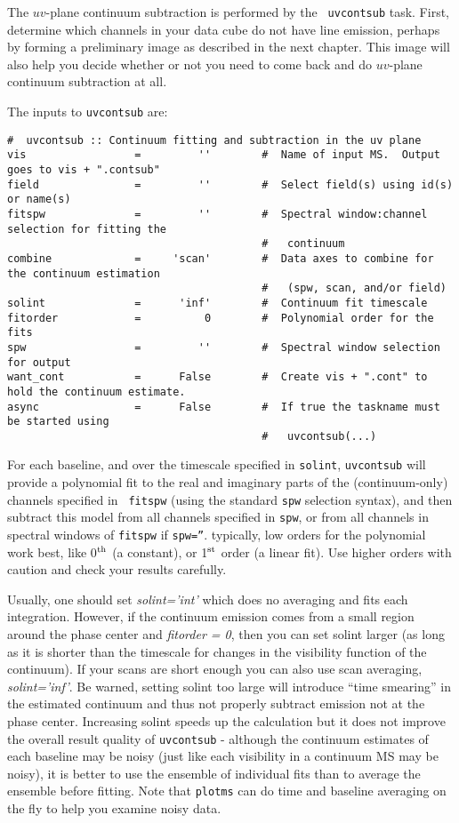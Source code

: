 {The $uv$-plane continuum subtraction is performed by the {\tt
  uvcontsub} task.  First, determine which channels in your data cube
do not have line emission, perhaps by forming a preliminary image as
described in the next chapter.  This image will also help you decide
whether or not you need to come back and do $uv$-plane continuum
subtraction at all. 


The inputs to {\tt uvcontsub} are:
\small
\begin{verbatim}
#  uvcontsub :: Continuum fitting and subtraction in the uv plane
vis                 =         ''        #  Name of input MS.  Output goes to vis + ".contsub"
field               =         ''        #  Select field(s) using id(s) or name(s)
fitspw              =         ''        #  Spectral window:channel selection for fitting the
                                        #   continuum
combine             =     'scan'        #  Data axes to combine for the continuum estimation
                                        #   (spw, scan, and/or field)
solint              =      'inf'        #  Continuum fit timescale
fitorder            =          0        #  Polynomial order for the fits
spw                 =         ''        #  Spectral window selection for output
want_cont           =      False        #  Create vis + ".cont" to hold the continuum estimate.
async               =      False        #  If true the taskname must be started using
                                        #   uvcontsub(...)
\end{verbatim}

For each baseline, and over the timescale specified in {\tt solint},
{\tt uvcontsub} will provide a polynomial fit to the real and
imaginary parts of the (continuum-only) channels specified in {\tt
fitspw} (using the standard {\tt spw} selection syntax), 
and then subtract this model from all channels specified in {\tt spw}, or
from all channels in spectral windows of {\tt fitspw} if {\tt spw=''}.
typically, low orders for the polynomial work best, like 0$^{\rm th}$ (a
constant), or 1$^{\rm st}$ order (a linear fit). Use higher orders with caution
and check your results carefully.

Usually, one should set {\it solint='int'} which does no averaging and fits
each integration. However, if the continuum emission comes from a small
region around the phase center and {\it fitorder = 0}, then you can set solint
larger (as long as it is shorter than the timescale for changes in the
visibility function of the continuum).  If your scans are short enough you
can also use scan averaging, {\it solint='inf'}. Be warned, setting solint too
large will introduce ``time smearing'' in the estimated continuum and thus
not properly subtract emission not at the phase center.  Increasing solint
speeds up the calculation but it does not improve the overall result
quality of {\tt uvcontsub} - although the continuum estimates of each baseline
may be noisy (just like each visibility in a continuum MS may be noisy),
it is better to use the ensemble of individual fits than to average the
ensemble before fitting.  Note that {\tt plotms} can do time and baseline
averaging on the fly to help you examine noisy data.


}
